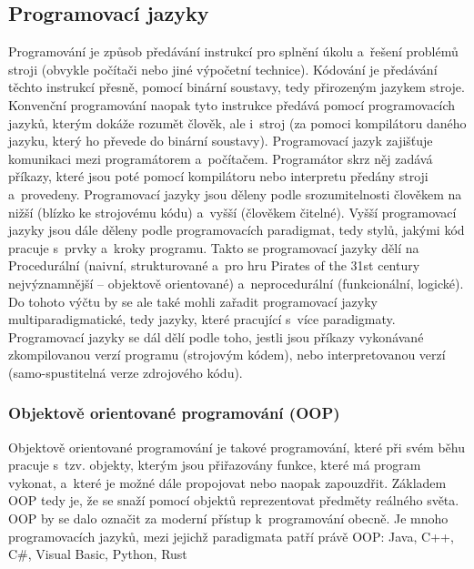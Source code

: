 \documentclass[a4paper]{extarticle}
\begin{document}
\subsection{Programovací jazyky}
Programování je způsob předávání instrukcí pro splnění úkolu a~řešení problémů stroji (obvykle počítači nebo jiné výpočetní technice). Kódování je předávání těchto instrukcí přesně, pomocí binární soustavy, tedy přirozeným jazykem stroje. Konvenční programování naopak tyto instrukce předává pomocí programovacích jazyků, kterým dokáže rozumět člověk, ale i~stroj (za pomoci kompilátoru daného jazyku, který ho převede do binární soustavy).
Programovací jazyk zajišťuje komunikaci mezi programátorem a~počítačem. Programátor skrz něj zadává příkazy, které jsou poté pomocí kompilátoru nebo interpretu předány stroji a~provedeny. 
Programovací jazyky jsou děleny podle srozumitelnosti člověkem na nižší (blízko ke strojovému kódu) a~vyšší (člověkem čitelné). 
Vyšší programovací jazyky jsou dále děleny podle programovacích paradigmat, tedy stylů, jakými kód pracuje s~prvky a~kroky programu. Takto se programovací jazyky dělí na Procedurální (naivní, strukturované a~pro hru Pirates of the 31st century nejvýznamnější – objektově orientované) a~neprocedurální (funkcionální, logické). Do tohoto výčtu by se ale také mohli zařadit programovací jazyky multiparadigmatické, tedy jazyky, které pracující s~více paradigmaty.
Programovací jazyky se dál dělí podle toho, jestli jsou příkazy vykonávané zkompilovanou verzí programu (strojovým kódem), nebo interpretovanou verzí (samo-spustitelná verze zdrojového kódu).
\subsubsection{Objektově orientované programování (OOP)}
Objektově orientované programování je takové programování, které při svém běhu pracuje s~tzv. objekty, kterým jsou přiřazovány funkce, které má program vykonat, a~které je možné dále propojovat nebo naopak zapouzdřit. Základem OOP tedy je, že se snaží pomocí objektů reprezentovat předměty reálného světa. OOP by se dalo označit za moderní přístup k~programování obecně.
Je mnoho programovacích jazyků, mezi jejichž paradigmata patří právě OOP: Java, C++, C\#, Visual Basic, Python, Rust
\end{document}
